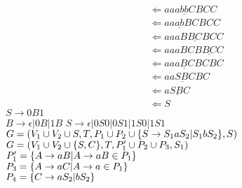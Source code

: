 \documentclass[a4paper, twocolumn]{ctexart}
\DeclarePairedDelimiter{\set}{\{}{\}}
\newcommand{\ffrom}{\Leftarrow}
\begin{document}
\begin{outline}[enumerate]
\begin{align*}
        & \ffrom aaa\underline{bb}CBCC \\
        & \ffrom aa\underline{ab}BCBCC \\
        & \ffrom aaaB\underline{BC}BCC \\
        & \ffrom aaaBCB\underline{BC}C \\
        & \ffrom aa\underline{aBC}BCBC \\
        & \ffrom a\underline{aSBC}BC \\
        & \ffrom \underline{aSBC} \\
        & \ffrom S
    \end{align*}
    \1[8]
        \2[(2)]
            $ S \to 0B1 $ \\
            $ B \to \epsilon | 0B | 1B $
        \2[(6)]
            $S \to \epsilon | 0S0 | 0S1 | 1S0 | 1S1 $
    \1[10] \2[(3)]
        $G = (V_1 \cup V_2 \cup {S}, T,  P_1 \cup P_2 \cup \\ \set*{S \to S_1aS_2 | S_1bS_2}, S) $
    \1[11] \2[(3)]
        $G = (V_1 \cup V_2 \cup \set*{S, C}, T, P_1' \cup P_2 \cup P_3, S_1)$ \\
        $P_1' = \set*{A \to a B | A \to a B \in P_1}$ \\
        $P_3 = \set*{A \to a C | A \to a \in P_1}$ \\
        $P_4 = \set*{C \to aS_2 | bS_2}$

\end{outline}
\end{document}
